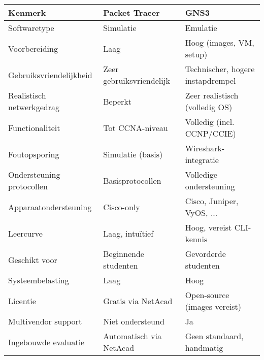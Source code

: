 \documentclass[a0,portrait]{hogent-poster}
\begin{document}
\begin{flushleft}

    \footnotesize
    
    \setlength{\tabcolsep}{5pt}
    \renewcommand{\arraystretch}{1.27}
    
    \begin{tabular}{|p{}|p{}|p{}|}
        \hline
        \textbf{Kenmerk} & \textbf{Packet Tracer} & \textbf{GNS3} \\
        \hline
        Softwaretype & Simulatie & Emulatie \\
        Voorbereiding & Laag & Hoog (images, VM, setup) \\
        Gebruiksvriendelijkheid & Zeer gebruiksvriendelijk & Technischer, hogere instapdrempel \\
        Realistisch netwerkgedrag & Beperkt & Zeer realistisch (volledig OS) \\
        Functionaliteit & Tot CCNA-niveau & Volledig (incl. CCNP/CCIE) \\
        Foutopsporing & Simulatie (basis) & Wireshark-integratie \\
        Ondersteuning protocollen & Basisprotocollen & Volledige ondersteuning \\
        Apparaatondersteuning & Cisco-only & Cisco, Juniper, VyOS, ... \\
        Leercurve & Laag, intuïtief & Hoog, vereist CLI-kennis \\
        Geschikt voor & Beginnende studenten & Gevorderde studenten \\
        Systeembelasting & Laag & Hoog \\
        Licentie & Gratis via NetAcad & Open-source (images vereist) \\
        Multivendor support & Niet ondersteund & Ja \\
        Ingebouwde evaluatie & Automatisch via NetAcad & Geen standaard, handmatig \\
        \hline
    \end{tabular}

\end{flushleft}



   
\end{document}
